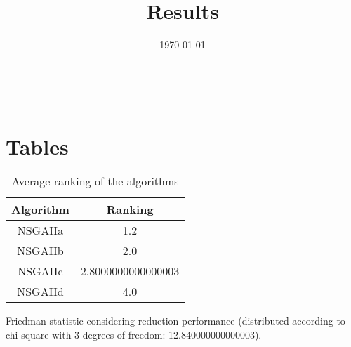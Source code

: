 \documentclass{article}
\title{Results}
\author{}
\date{\today}
\begin{document}
\oddsidemargin 0in \topmargin 0in\maketitle
\
\section{Tables}
\begin{table}[!htp]
\centering
\caption{Average ranking of the algorithms}
\begin{tabular}{c|c}
Algorithm&Ranking\\
\hline
NSGAIIa&1.2\\
NSGAIIb&2.0\\
NSGAIIc&2.8000000000000003\\
NSGAIId&4.0\\
\end{tabular}
\end{table}


Friedman statistic considering reduction performance (distributed according to chi-square with 3 degrees of freedom: 12.840000000000003).
\end{document}
